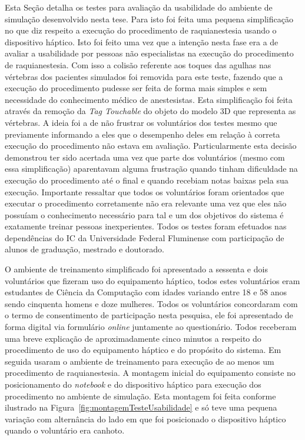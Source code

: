 Esta Seção detalha os testes para avaliação da usabilidade do ambiente de simulação desenvolvido nesta tese. Para isto foi feita uma pequena simplificação no que diz respeito a execução do procedimento de raquianestesia usando o dispositivo háptico. Isto foi feito uma vez que a intenção nesta fase era a de avaliar a usabilidade por pessoas não especialistas na execução do procedimento de raquianestesia. Com isso a colisão referente aos toques das agulhas nas vértebras dos pacientes simulados foi removida para este teste, fazendo que a execução do procedimento pudesse ser feita de forma mais simples e sem necessidade do conhecimento médico de anestesistas. Esta simplificação foi feita através da remoção da \textit{Tag Touchable} do objeto do modelo 3D que representa as vértebras. 
A ideia foi a de não frustrar os voluntários dos testes mesmo que previamente informando a eles que o desempenho deles em relação à correta execução do procedimento não estava em avaliação. Particularmente esta decisão  demonstrou ter sido acertada uma vez que parte dos voluntários (mesmo com essa simplificação) aparentavam alguma frustração quando tinham dificuldade na execução do procedimento até o final e quando recebiam notas baixas pela sua execução. Importante ressaltar que todos os voluntários foram orientados que executar o procedimento corretamente não era relevante uma vez que eles não possuíam o conhecimento necessário para tal e um dos objetivos do sistema é exatamente treinar pessoas inexperientes. Todos os testes foram efetuados nas dependências do IC da Universidade Federal Fluminense com participação de alunos de graduação, mestrado e doutorado.

O ambiente de treinamento simplificado foi apresentado a sessenta e dois voluntários que fizeram uso do equipamento háptico, todos estes voluntários eram estudantes de Ciência da Computação com idades variando entre 18 e 58 anos sendo cinquenta homens e doze mulheres. Todos os voluntários concordaram com o termo de consentimento de participação nesta pesquisa, ele foi apresentado de forma digital via formulário \textit{online} juntamente ao questionário. Todos receberam uma breve explicação de aproximadamente cinco minutos a respeito do procedimento de uso do equipamento háptico e do propósito do sistema. Em seguida usaram o ambiente de treinamento para execução de ao menos um procedimento de raquianestesia. A montagem inicial do equipamento consiste no posicionamento do \textit{notebook} e do dispositivo háptico para execução dos procedimento no ambiente de simulação. Esta montagem foi feita conforme ilustrado na Figura~\ref{fig:montagemTesteUsabilidade} e só teve uma pequena variação com alternância do lado em que foi posicionado o dispositivo háptico quando o voluntário era canhoto.

